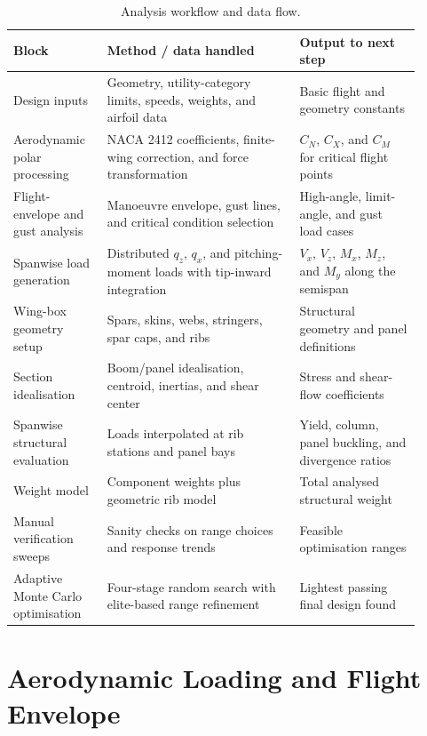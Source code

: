 \documentclass[11pt]{article}
\begin{document}
\begin{table}[H]
\centering
\caption{Analysis workflow and data flow.}
\label{tab:workflow}
\small
\begin{tabular}{>{\raggedright\arraybackslash}p{0.21\linewidth}>{\raggedright\arraybackslash}p{0.43\linewidth}>{\raggedright\arraybackslash}p{0.27\linewidth}}
\toprule
Block & Method / data handled & Output to next step \\
\midrule
Design inputs & Geometry, utility-category limits, speeds, weights, and airfoil data & Basic flight and geometry constants \\
Aerodynamic polar processing & NACA 2412 coefficients, finite-wing correction, and force transformation & $C_N$, $C_X$, and $C_M$ for critical flight points \\
Flight-envelope and gust analysis & Manoeuvre envelope, gust lines, and critical condition selection & High-angle, limit-angle, and gust load cases \\
Spanwise load generation & Distributed $q_z$, $q_x$, and pitching-moment loads with tip-inward integration & $V_x$, $V_z$, $M_x$, $M_z$, and $M_y$ along the semispan \\
Wing-box geometry setup & Spars, skins, webs, stringers, spar caps, and ribs & Structural geometry and panel definitions \\
Section idealisation & Boom/panel idealisation, centroid, inertias, and shear center & Stress and shear-flow coefficients \\
Spanwise structural evaluation & Loads interpolated at rib stations and panel bays & Yield, column, panel buckling, and divergence ratios \\
Weight model & Component weights plus geometric rib model & Total analysed structural weight \\
Manual verification sweeps & Sanity checks on range choices and response trends & Feasible optimisation ranges \\
Adaptive Monte Carlo optimisation & Four-stage random search with elite-based range refinement & Lightest passing final design found \\
\bottomrule
\end{tabular}
\end{table}


\section{Aerodynamic Loading and Flight Envelope}
\end{document}
